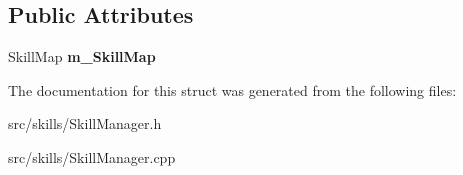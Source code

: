 \subsection*{Public Attributes}
\begin{DoxyCompactItemize}
\item 
\mbox{\label{struct_skill_collection_a2a3a4fd4030c667c745f6e70b2427942}} 
Skill\+Map {\bfseries m\+\_\+\+Skill\+Map}
\end{DoxyCompactItemize}


The documentation for this struct was generated from the following files\+:\begin{DoxyCompactItemize}
\item 
src/skills/Skill\+Manager.\+h\item 
src/skills/Skill\+Manager.\+cpp\end{DoxyCompactItemize}

